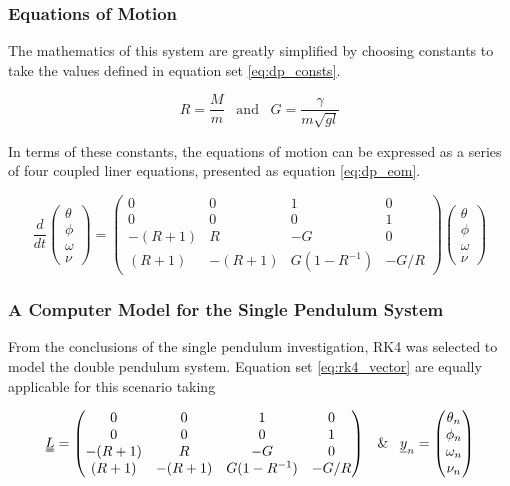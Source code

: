 \documentclass[11pt]{article}
\begin{document}
\subsubsection*{Equations of Motion}

The mathematics of this system are greatly simplified by choosing constants to take the values defined in equation set \ref{eq:dp_consts}.

\begin{equation} \label{eq:dp_consts}
	R = \frac{M}{m} \;\;\; \text{and} \;\;\; G = \frac{\gamma}{m \sqrt{gl}}
\end{equation}

In terms of these constants, the equations of motion can be expressed as a series of four coupled liner equations, presented as equation \ref{eq:dp_eom}.

\begin{equation}\label{eq:dp_eom}	
\frac{d}{dt} \begin{pmatrix} \theta \\ \phi \\ \omega \\ \nu \end{pmatrix} = 
	\begin{pmatrix}
		0 & 0 & 1 & 0 \\
		0 & 0 & 0 & 1 \\
		-(R+1) & R & -G & 0 \\
		(R+1) & -(R+1) & G(1-R^{-1}) & -G/R
	\end{pmatrix}
	\begin{pmatrix} \theta \\ \phi \\ \omega \\ \nu \end{pmatrix}
\end{equation}

\subsubsection*{A Computer Model for the Single Pendulum System}

From the conclusions of the single pendulum investigation, RK4 was selected to model the double pendulum system. Equation set \ref{eq:rk4_vector} are equally applicable for this scenario taking

\begin{equation} \nonumber
\begin{centering}
\uuline{L} = \begin{pmatrix}
		0 & 0 & 1 & 0 \\
		0 & 0 & 0 & 1 \\
		-(R+1) & R & -G & 0 \\
		(R+1) & -(R+1) & G(1-R^{-1}) & -G/R
	\end{pmatrix} \;\;\; \text{\&} \;\;\; \underline{y}_{n} = \begin{pmatrix} \theta_{n} \\ \phi_{n} \\ \omega_{n} \\ \nu_{n} \end{pmatrix}
\end{centering}
\end{equation}
\end{document}
